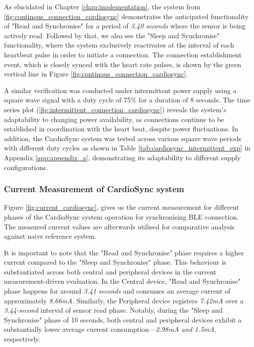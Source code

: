 \noindent As elucidated in Chapter \ref{chap:implementation}, the system from \autoref{fig:continous_connection_cardiosync} demonstrates the anticipated functionality of "Read and Synchronise" for a period of \textit{3.40 seconds} where the sensor is being actively read. Followed by that, we also see  the "Sleep and Synchronise" functionality, where the system exclusively reactivates at the interval of each heartbeat pulse in order to initiate a connection. The connection establishment event, which is closely synced with the heart rate pulses, is shown by the green vertical line in Figure \ref{fig:continous_connection_cardiosync}.
\vspace{1\baselineskip}

\noindent A similar verification was conducted under intermittent power supply using a square wave signal with a duty cycle of 75\% for a duration of 8 seconds. The time series plot (\autoref{fig:intermittent_connection_cardiosync}) reveals the system's adaptability to changing power availability, as connections continue to be established in coordination with the heart beat, despite power fluctuations. In addition, the CardioSync system was tested across various square wave periods with different duty cycles as shown in Table \ref{tab:cardiosync_intermittent_exp} in Appendix \ref{app:appendix_a}, demonstrating its adaptability to different supply configurations.

\subsubsection{Current Measurement of CardioSync system}
Figure \ref{fig:current_cardiosync}, gives us the current measurement for different phases of the CardioSync system operation for synchronising BLE connection. The measured current values are afterwards utilised for comparative analysis against naive reference system.
\vspace{1\baselineskip}

\noindent It is important to note that the "Read and Synchronise" phase requires a higher current compared to the "Sleep and Synchronise" phase. This behaviour is substantiated across both central and peripheral devices in the current measurement-driven evaluation. In the Central device, "Read and Synchronise" phase happens for around \textit{3.41 seconds} and consumes an average current of approximately \textit{8.66mA}. Similarly, the Peripheral device registers \textit{7.42mA} over a \textit{3.44-second} interval of sensor read phase. Notably, during the "Sleep and Synchronise" phase of 10 seconds, both central and peripheral devices exhibit a substantially lower average current consumption—\textit{2.98mA and 1.5mA}, respectively.
\vspace{1\baselineskip}

